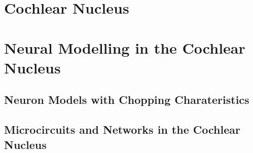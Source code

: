 \documentclass[10pt,a4paper,twoside,openright]{book}
\begin{document}
\section{Cochlear Nucleus}\label{Ch1:CochelarNucleus}






\section{Neural Modelling in the Cochlear Nucleus}

\subsection{Neuron Models with Chopping Charateristics}

\subsection{Microcircuits and Networks in the Cochlear Nucleus}







 

\newpage
\listoftodos
\end{document}
